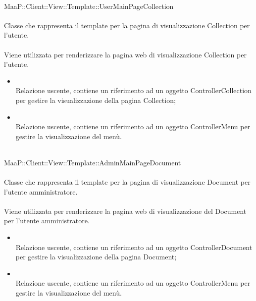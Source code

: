 \\
MaaP::Client::View::Template::UserMainPageCollection\\
\\
Classe che rappresenta il template per la pagina di visualizzazione Collection per l'utente.\\
\\
Viene utilizzata per renderizzare la pagina web di visualizzazione Collection per l'utente.\\
\begin{itemize}
\item{}\\
Relazione uscente, contiene un riferimento ad un oggetto ControllerCollection per gestire la visualizzazione della pagina Collection;
\item{}\\
Relazione uscente, contiene un riferimento ad un oggetto ControllerMenu per gestire la visualizzazione del menù.
\end{itemize}

\\
MaaP::Client::View::Template::AdminMainPageDocument\\
\\
Classe che rappresenta il template per la pagina di visualizzazione Document per l'utente amministratore.\\
\\
Viene utilizzata per renderizzare la pagina web di visualizzazione del Document per l'utente amministratore.\\
\begin{itemize}
\item{}\\
Relazione uscente, contiene un riferimento ad un oggetto ControllerDocument per gestire la visualizzazione della pagina Document;
\item{}\\
Relazione uscente, contiene un riferimento ad un oggetto ControllerMenu per gestire la visualizzazione del menù.
\end{itemize}

